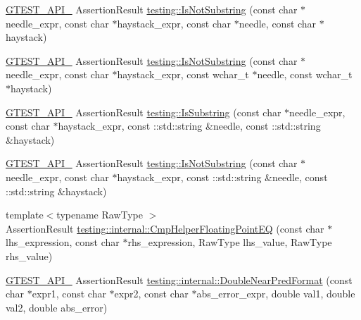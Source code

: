 \begin{DoxyCompactItemize}
\item 
\mbox{\hyperlink{_obj__test_2lib_2googletest-release-1_88_81_2googletest_2include_2gtest_2internal_2gtest-port_8h_aa73be6f0ba4a7456180a94904ce17790}{G\+T\+E\+S\+T\+\_\+\+A\+P\+I\+\_\+}} Assertion\+Result \mbox{\hyperlink{namespacetesting_a2288dcf4249f88af67dcd46544dc49a6}{testing\+::\+Is\+Not\+Substring}} (const char $\ast$needle\+\_\+expr, const char $\ast$haystack\+\_\+expr, const char $\ast$needle, const char $\ast$haystack)
\item 
\mbox{\hyperlink{_obj__test_2lib_2googletest-release-1_88_81_2googletest_2include_2gtest_2internal_2gtest-port_8h_aa73be6f0ba4a7456180a94904ce17790}{G\+T\+E\+S\+T\+\_\+\+A\+P\+I\+\_\+}} Assertion\+Result \mbox{\hyperlink{namespacetesting_a53e5c6e91ea429c43de7f4f57e33d166}{testing\+::\+Is\+Not\+Substring}} (const char $\ast$needle\+\_\+expr, const char $\ast$haystack\+\_\+expr, const wchar\+\_\+t $\ast$needle, const wchar\+\_\+t $\ast$haystack)
\item 
\mbox{\hyperlink{_obj__test_2lib_2googletest-release-1_88_81_2googletest_2include_2gtest_2internal_2gtest-port_8h_aa73be6f0ba4a7456180a94904ce17790}{G\+T\+E\+S\+T\+\_\+\+A\+P\+I\+\_\+}} Assertion\+Result \mbox{\hyperlink{namespacetesting_a571c7edcfc574269833ebe3e7d338ec5}{testing\+::\+Is\+Substring}} (const char $\ast$needle\+\_\+expr, const char $\ast$haystack\+\_\+expr, const \+::std\+::string \&needle, const \+::std\+::string \&haystack)
\item 
\mbox{\hyperlink{_obj__test_2lib_2googletest-release-1_88_81_2googletest_2include_2gtest_2internal_2gtest-port_8h_aa73be6f0ba4a7456180a94904ce17790}{G\+T\+E\+S\+T\+\_\+\+A\+P\+I\+\_\+}} Assertion\+Result \mbox{\hyperlink{namespacetesting_abe7b3fa1c9528745f934d4a14155ea87}{testing\+::\+Is\+Not\+Substring}} (const char $\ast$needle\+\_\+expr, const char $\ast$haystack\+\_\+expr, const \+::std\+::string \&needle, const \+::std\+::string \&haystack)
\item 
{\footnotesize template$<$typename Raw\+Type $>$ }\\Assertion\+Result \mbox{\hyperlink{namespacetesting_1_1internal_a98ce463e5dbe0c6120fa817e1f8f2944}{testing\+::internal\+::\+Cmp\+Helper\+Floating\+Point\+EQ}} (const char $\ast$lhs\+\_\+expression, const char $\ast$rhs\+\_\+expression, Raw\+Type lhs\+\_\+value, Raw\+Type rhs\+\_\+value)
\item 
\mbox{\hyperlink{_obj__test_2lib_2googletest-release-1_88_81_2googletest_2include_2gtest_2internal_2gtest-port_8h_aa73be6f0ba4a7456180a94904ce17790}{G\+T\+E\+S\+T\+\_\+\+A\+P\+I\+\_\+}} Assertion\+Result \mbox{\hyperlink{namespacetesting_1_1internal_a4f70b36c624b54c2362aeecc2f05ee8c}{testing\+::internal\+::\+Double\+Near\+Pred\+Format}} (const char $\ast$expr1, const char $\ast$expr2, const char $\ast$abs\+\_\+error\+\_\+expr, double val1, double val2, double abs\+\_\+error)

\end{DoxyCompactItemize}
